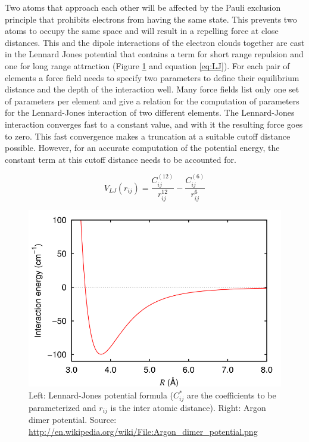 \documentclass[english, a4paper, 12pt, titlepage, draft]{article}
\begin{document}
Two atoms that approach each other will be affected by the Pauli exclusion principle that prohibits electrons from having the same state.
This prevents two atoms to occupy the same space and will result in a repelling force at close distances.
This and the dipole interactions of the electron clouds together are cast in the Lennard Jones potential that contains a term for short range repulsion and one for long range attraction (Figure \ref{fig:LJ} and equation \ref{eq:LJ}).
For each pair of elements a force field needs to specify two parameters to define their equilibrium distance and the depth of the interaction well.
Many force fields list only one set of parameters per element and give a relation for the computation of parameters for the Lennard-Jones interaction of two different elements.
The Lennard-Jones interaction converges fast to a constant value, and with it the resulting force goes to zero.
This fast convergence makes a truncation at a suitable cutoff distance possible.
However, for an accurate computation of the potential energy, the constant term at this cutoff distance needs to be accounted for.

\begin{figure}
    \begin{minipage}[]{0.45\linewidth}
        \centering
        \vfill
        \begin{equation}
            V_{LJ}(r_{ij}) = \frac{C^{(12)}_{ij}}{r^{12}_{ij}} - \frac{C^{(6)}_{ij}}{r^{6}_{ij}}
            \label{eq:LJ}
        \end{equation} 
        \vfill 
    \end{minipage}
\hspace{0.5cm}
    \begin{minipage}[]{0.45\linewidth}
        \centering
        \includegraphics[width=\textwidth]{figures/Argon_dimer_potential.png} 
    \end{minipage}
    \caption{Left: Lennard-Jones potential formula ($C^{*}_{ij}$ are the coefficients to be parameterized and $r_{ij}$ is the inter atomic distance). Right: Argon dimer potential. Source: \url{http://en.wikipedia.org/wiki/File:Argon_dimer_potential.png}}
\label{fig:LJ}
\end{figure}
\end{document}
